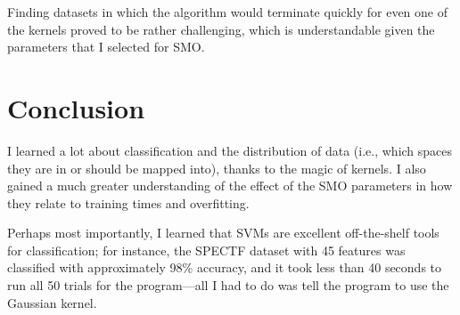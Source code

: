 \documentclass{journal}
\begin{document}
Finding datasets in which the algorithm would terminate quickly for
even one of the kernels proved to be rather challenging, which is understandable
given the parameters that I selected for SMO.

\section{Conclusion}

I learned a lot about classification and the distribution of data (i.e., which
spaces they are in or should be mapped into), thanks to the magic of kernels. I
also gained a much greater understanding of the effect of the SMO parameters
in how they relate to training times and overfitting.

Perhaps most importantly, I learned that SVMs are excellent off-the-shelf tools
for classification; for instance, the SPECTF dataset with 45 features was
classified with approximately 98\% accuracy, and it took less than 40 seconds
to run all 50 trials for the program---all I had to do was tell the program to
use the Gaussian kernel.
\end{document}
